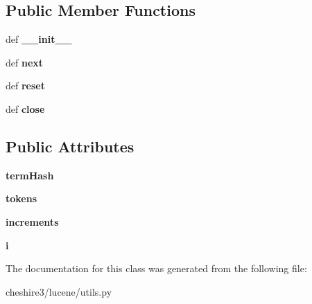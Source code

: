 \subsection*{Public Member Functions}
\begin{DoxyCompactItemize}
\item 
\hypertarget{classcheshire3_1_1lucene_1_1utils_1_1_c3_token_stream_a9bff62b145ce8366e08dd87bfb46ccea}{def {\bfseries \-\_\-\-\_\-init\-\_\-\-\_\-}}\label{classcheshire3_1_1lucene_1_1utils_1_1_c3_token_stream_a9bff62b145ce8366e08dd87bfb46ccea}

\item 
\hypertarget{classcheshire3_1_1lucene_1_1utils_1_1_c3_token_stream_af708881ae87c8abe4a46cc4ad7536826}{def {\bfseries next}}\label{classcheshire3_1_1lucene_1_1utils_1_1_c3_token_stream_af708881ae87c8abe4a46cc4ad7536826}

\item 
\hypertarget{classcheshire3_1_1lucene_1_1utils_1_1_c3_token_stream_ad2cb72dd1e095e4ded7760d88a297bd0}{def {\bfseries reset}}\label{classcheshire3_1_1lucene_1_1utils_1_1_c3_token_stream_ad2cb72dd1e095e4ded7760d88a297bd0}

\item 
\hypertarget{classcheshire3_1_1lucene_1_1utils_1_1_c3_token_stream_a1a9b1c6d013bc0c00a24589a7a27bea4}{def {\bfseries close}}\label{classcheshire3_1_1lucene_1_1utils_1_1_c3_token_stream_a1a9b1c6d013bc0c00a24589a7a27bea4}

\end{DoxyCompactItemize}
\subsection*{Public Attributes}
\begin{DoxyCompactItemize}
\item 
\hypertarget{classcheshire3_1_1lucene_1_1utils_1_1_c3_token_stream_a81ea37a68df9a477752841a9d93dd352}{{\bfseries term\-Hash}}\label{classcheshire3_1_1lucene_1_1utils_1_1_c3_token_stream_a81ea37a68df9a477752841a9d93dd352}

\item 
\hypertarget{classcheshire3_1_1lucene_1_1utils_1_1_c3_token_stream_a366adc5634de0862951ebcc40a2e9dac}{{\bfseries tokens}}\label{classcheshire3_1_1lucene_1_1utils_1_1_c3_token_stream_a366adc5634de0862951ebcc40a2e9dac}

\item 
\hypertarget{classcheshire3_1_1lucene_1_1utils_1_1_c3_token_stream_a1669af8be643a58f041027b7bfca2973}{{\bfseries increments}}\label{classcheshire3_1_1lucene_1_1utils_1_1_c3_token_stream_a1669af8be643a58f041027b7bfca2973}

\item 
\hypertarget{classcheshire3_1_1lucene_1_1utils_1_1_c3_token_stream_a7f2796a14e3b594be34ad7546fd473b5}{{\bfseries i}}\label{classcheshire3_1_1lucene_1_1utils_1_1_c3_token_stream_a7f2796a14e3b594be34ad7546fd473b5}

\end{DoxyCompactItemize}


The documentation for this class was generated from the following file\-:\begin{DoxyCompactItemize}
\item 
cheshire3/lucene/utils.\-py\end{DoxyCompactItemize}
